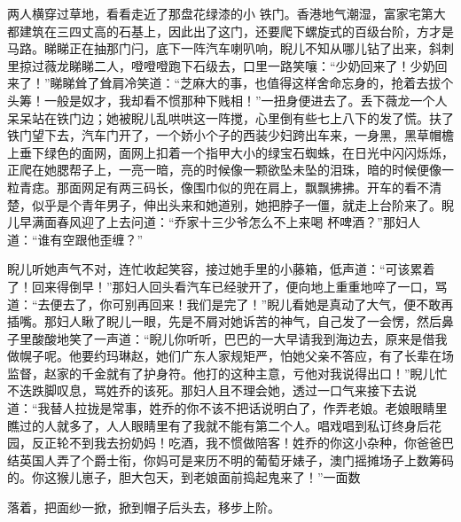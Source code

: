 \documentclass{article}
\begin{document}
两人横穿过草地，看看走近了那盘花绿漆的小
\newpage
铁门。香港地气潮湿，富家宅第大都建筑在三四丈高的石基上，因此出了这门，还要爬下螺旋式的百级台阶，方才是马路。睇睇正在抽那门闩，底下一阵汽车喇叭响，睨儿不知从哪儿钻了出来，斜刺里掠过薇龙睇睇二人，噔噔噔跑下石级去，口里一路笑嚷：“少奶回来了！少奶回来了！”睇睇耸了耸肩冷笑道：“芝麻大的事，也值得这样舍命忘身的，抢着去拔个头筹！一般是奴才，我却看不惯那种下贱相！”一扭身便进去了。丢下薇龙一个人呆呆站在铁门边；她被睨儿乱哄哄这一阵搅，心里倒有些七上八下的发了慌。扶了铁门望下去，汽车门开了，一个娇小个子的西装少妇跨出车来，一身黑，黑草帽檐上垂下绿色的面网，面网上扣着一个指甲大小的绿宝石蜘蛛，在日光中闪闪烁烁，正爬在她腮帮子上，一亮一暗，亮的时候像一颗欲坠未坠的泪珠，暗的时候便像一粒青痣。那面网足有两三码长，像围巾似的兜在肩上，飘飘拂拂。开车的看不清楚，似乎是个青年男子，伸出头来和她道别，她把脖子一僵，就走上台阶来了。睨儿早满面春风迎了上去问道：“乔家十三少爷怎么不上来喝
杯啤酒？”那妇人道：“谁有空跟他歪缠？” 

\newpage

睨儿听她声气不对，连忙收起笑容，接过她手里的小藤箱，低声道：“可该累着了！回来得倒早！”那妇人回头看汽车已经驶开了，便向地上重重地啐了一口，骂道：“去便去了，你可别再回来！我们是完了！”睨儿看她是真动了大气，便不敢再插嘴。那妇人瞅了睨儿一眼，先是不屑对她诉苦的神气，自己发了一会愣，然后鼻子里酸酸地笑了一声道：“睨儿你听听，巴巴的一大早请我到海边去，原来是借我做幌子呢。他要约玛琳赵，她们广东人家规矩严，怕她父亲不答应，有了长辈在场监督，赵家的千金就有了护身符。他打的这种主意，亏他对我说得出口！”睨儿忙不迭跌脚叹息，骂姓乔的该死。那妇人且不理会她，透过一口气来接下去说道：“我替人拉拢是常事，姓乔的你不该不把话说明白了，作弄老娘。老娘眼睛里瞧过的人就多了，人人眼睛里有了我就不能有第二个人。唱戏唱到私订终身后花园，反正轮不到我去扮奶妈！吃酒，我不惯做陪客！姓乔的你这小杂种，你爸爸巴结英国人弄了个爵士衔，你妈可是来历不明的葡萄牙婊子，澳门摇摊场子上数筹码的。你这猴儿崽子，胆大包天，到老娘面前捣起鬼来了！”一面数

\newpage
落着，把面纱一掀，掀到帽子后头去，移步上阶。 
\end{document}

